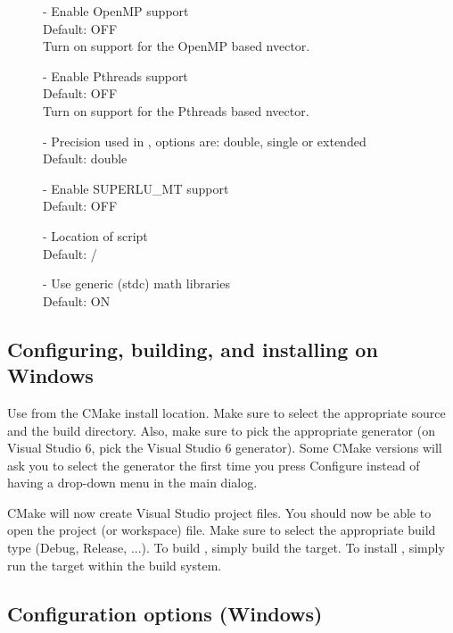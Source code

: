 \begin{description}
\item[] -  
  Enable OpenMP support
  \\
  Default: OFF 
  \\
  Turn on support for the OpenMP based nvector.
\item[] -  
  Enable Pthreads support
  \\
  Default: OFF 
  \\
  Turn on support for the Pthreads based nvector.
\item[] -   
  Precision used in {\sundials}, options are: double, single or extended
  \\
  Default: double 
\item[] - 
  Enable SUPERLU\_MT support   
  \\
  Default: OFF 
\item[] - 
  Location of  script   
  \\
  Default: / 
\item[] -   
  Use generic (stdc) math libraries
  \\
  Default: ON 
\end{description}

\subsection{Configuring, building, and installing  on Windows}
Use  from the CMake install location.
Make sure to select the appropriate source and the build directory.
Also, make sure to pick the appropriate generator (on Visual Studio 6, 
pick the Visual Studio 6 generator). Some CMake versions will ask you 
to select the generator the first time you press Configure instead of 
having a drop-down menu in the main dialog. 

CMake will now create Visual Studio project files. You should now be able to 
open the {\sundials} project (or workspace) file. Make sure to select the appropriate 
build type (Debug, Release, ...). To build {\sundials}, simply build the 
target. To install {\sundials}, simply run the  target within the build system.



\subsection{Configuration options (Windows)}\label{ss:configuration_options_w}

